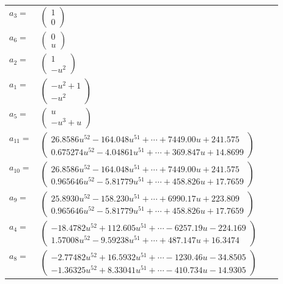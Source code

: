\documentclass[1p]{elsarticle_modified}
\theoremstyle{definition}
\begin{document}
\begin{tabular}{m{7pt} m{180pt} m{7pt} m{180pt} }
\flushright $a_{3}=$&$\begin{pmatrix}1\\0\end{pmatrix}$ \\
\flushright $a_{6}=$&$\begin{pmatrix}0\\u\end{pmatrix}$ \\
\flushright $a_{2}=$&$\begin{pmatrix}1\\- u^2\end{pmatrix}$ \\
\flushright $a_{1}=$&$\begin{pmatrix}- u^2+1\\- u^2\end{pmatrix}$ \\
\flushright $a_{5}=$&$\begin{pmatrix}u\\- u^3+u\end{pmatrix}$ \\
\flushright $a_{11}=$&$\begin{pmatrix}26.8586 u^{52}-164.048 u^{51}+\cdots+7449.00 u+241.575\\0.675274 u^{52}-4.04861 u^{51}+\cdots+369.847 u+14.8699\end{pmatrix}$ \\
\flushright $a_{10}=$&$\begin{pmatrix}26.8586 u^{52}-164.048 u^{51}+\cdots+7449.00 u+241.575\\0.965646 u^{52}-5.81779 u^{51}+\cdots+458.826 u+17.7659\end{pmatrix}$ \\
\flushright $a_{9}=$&$\begin{pmatrix}25.8930 u^{52}-158.230 u^{51}+\cdots+6990.17 u+223.809\\0.965646 u^{52}-5.81779 u^{51}+\cdots+458.826 u+17.7659\end{pmatrix}$ \\
\flushright $a_{4}=$&$\begin{pmatrix}-18.4782 u^{52}+112.605 u^{51}+\cdots-6257.19 u-224.169\\1.57008 u^{52}-9.59238 u^{51}+\cdots+487.147 u+16.3474\end{pmatrix}$ \\
\flushright $a_{8}=$&$\begin{pmatrix}-2.77482 u^{52}+16.5932 u^{51}+\cdots-1230.46 u-34.8505\\-1.36325 u^{52}+8.33041 u^{51}+\cdots-410.734 u-14.9305\end{pmatrix}$ \\

\end{tabular}
\end{document}
